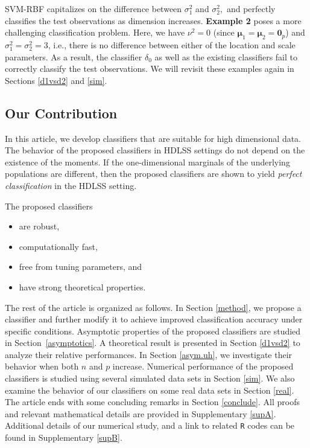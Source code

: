\documentclass[twoside]{article}
\newcommand{\bmu}{\boldsymbol{\mu}}
\newcommand{\0}{\mathbf{0}}
\newcommand{\1}{\mathbf{1}}
\numberwithin{equation}{section}
\begin{document}
SVM-RBF capitalizes on the difference between $\sigma^2_1$ and $\sigma^2_2,$ and perfectly classifies the test observations as dimension increases. {\bf Example 2} poses a more challenging classification problem. Here, we have $\nu^2=0$ (since $\bmu_{1}=\bmu_{2}=\0_p$) and $\sigma_1^2=\sigma_2^2 = 3$, i.e., there is no difference between either of the location and scale parameters. As a result, the classifier $\delta_0$ as well as the existing classifiers fail to correctly classify the test observations. We will revisit these examples again in Sections \ref{d1vsd2} and \ref{sim}.
\subsection{Our Contribution}
In this article, we develop classifiers that are suitable for high dimensional data. The behavior of the proposed classifiers in HDLSS settings do not depend on the existence of the moments. %
If the one-dimensional marginals of the underlying populations are different, then the proposed classifiers are shown to yield {\em perfect classification} in the HDLSS setting.
\vspace{-0.1cm}
\begin{tcolorbox}[colback=white]
The proposed  classifiers
\begin{itemize}
 \vspace{-0.2cm}
 \item are robust,
 \vspace{-0.2cm}
 \item computationally fast,
 \vspace{-0.2cm}
 \item free from tuning parameters, and
 \vspace{-0.2cm}
 \item have strong theoretical properties.
\end{itemize}
\end{tcolorbox}
\vspace{-0.1cm}
The rest of the article is organized as follows. In Section \ref{method}, we propose a classifier and further modify it to achieve improved classification accuracy under specific conditions. Asymptotic properties of the proposed classifiers are studied in Section~\ref{asymptotics}. A theoretical result is presented in Section \ref{d1vsd2} to analyze their relative performances. In Section \ref{asym.uh}, we investigate their behavior when both $n$ and $p$ increase. Numerical performance of the proposed classifiers is studied using several simulated data sets in Section \ref{sim}. We also examine the behavior of our classifiers on some real data sets in Section \ref{real}. The article ends with some concluding remarks in Section \ref{conclude}. All proofs and relevant mathematical details are provided in Supplementary \ref{supA}. Additional details of our numerical study, and a link to related {\tt R} codes can be found in Supplementary \ref{supB}.
\end{document}
